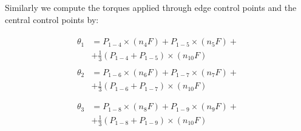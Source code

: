 \documentclass{egpubl}
\begin{document}
Similarly we compute the torques applied through edge control points and
the central control points by:

\begin{gather}
    \begin{split}
        \theta_1 & = P_{1-4} \times (n_4 F) + P_{1-5} \times (n_5 F) + \\
        & + \frac{1}{3} (P_{1-4} + P_{1-5}) \times (n_{10} F)
    \end{split}
    \\
    \begin{split}
        \theta_2 & = P_{1-6} \times (n_6 F) + P_{1-7} \times (n_7 F) + \\
        & + \frac{1}{3} (P_{1-6} + P_{1-7}) \times (n_{10} F) \\
    \end{split}
    \\
    \begin{split}
        \theta_3 & = P_{1-8} \times (n_8 F) + P_{1-9} \times (n_9 F) + \\
        & + \frac{1}{3} (P_{1-8} + P_{1-9}) \times (n_{10} F) \\
    \end{split}
\end{gather}

%
\end{document}
